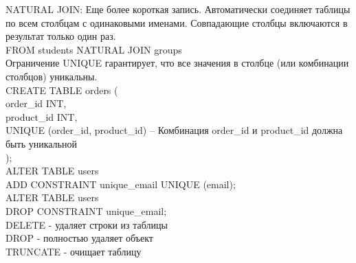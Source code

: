 \noindent NATURAL JOIN: Еще более короткая запись. Автоматически соединяет таблицы по всем столбцам с одинаковыми именами. Совпадающие столбцы включаются в результат только один раз. \\
FROM students NATURAL JOIN groups \\ 

\noindent Ограничение UNIQUE гарантирует, что все значения в столбце (или комбинации столбцов) уникальны. \\
CREATE TABLE orders ( \\
    order\_id INT, \\
    product\_id INT, \\
    UNIQUE (order\_id, product\_id) -- Комбинация order\_id и product\_id должна быть уникальной \\
); \\

\noindent ALTER TABLE users  \\
ADD CONSTRAINT unique\_email UNIQUE (email); \\

\noindent ALTER TABLE users  \\
DROP CONSTRAINT unique\_email; \\ 

\noindent DELETE - удаляет строки из таблицы \\
DROP - полностью удаляет объект \\
TRUNCATE - очищает таблицу

